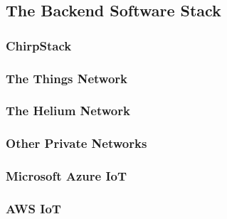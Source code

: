 \subsection{The Backend Software Stack}
\subsubsection{ChirpStack}
\subsubsection{The Things Network}

\subsubsection{The Helium Network}


\subsubsection{Other Private Networks}
\subsubsection{Microsoft Azure IoT}
\subsubsection{AWS IoT}
